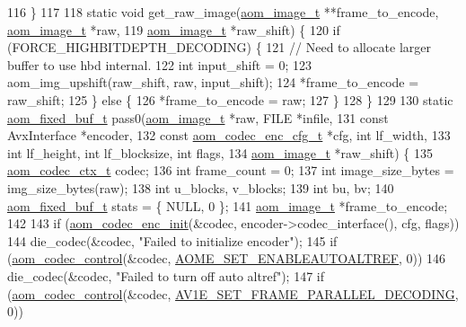 \begin{DoxyCodeInclude}
{116 \}
117 
118 \textcolor{keyword}{static} \textcolor{keywordtype}{void} get\_raw\_image(\hyperlink{structaom__image}{aom\_image\_t} **frame\_to\_encode, \hyperlink{structaom__image}{aom\_image\_t} *raw,
119                           \hyperlink{structaom__image}{aom\_image\_t} *raw\_shift) \{
120   \textcolor{keywordflow}{if} (FORCE\_HIGHBITDEPTH\_DECODING) \{
121     \textcolor{comment}{// Need to allocate larger buffer to use hbd internal.}
122     \textcolor{keywordtype}{int} input\_shift = 0;
123     aom\_img\_upshift(raw\_shift, raw, input\_shift);
124     *frame\_to\_encode = raw\_shift;
125   \} \textcolor{keywordflow}{else} \{
126     *frame\_to\_encode = raw;
127   \}
128 \}
129 
130 \textcolor{keyword}{static} \hyperlink{structaom__fixed__buf}{aom\_fixed\_buf\_t} pass0(\hyperlink{structaom__image}{aom\_image\_t} *raw, FILE *infile,
131                              \textcolor{keyword}{const} AvxInterface *encoder,
132                              \textcolor{keyword}{const} \hyperlink{structaom__codec__enc__cfg}{aom\_codec\_enc\_cfg\_t} *cfg, \textcolor{keywordtype}{int} lf\_width,
133                              \textcolor{keywordtype}{int} lf\_height, \textcolor{keywordtype}{int} lf\_blocksize, \textcolor{keywordtype}{int} flags,
134                              \hyperlink{structaom__image}{aom\_image\_t} *raw\_shift) \{
135   \hyperlink{structaom__codec__ctx}{aom\_codec\_ctx\_t} codec;
136   \textcolor{keywordtype}{int} frame\_count = 0;
137   \textcolor{keywordtype}{int} image\_size\_bytes = img\_size\_bytes(raw);
138   \textcolor{keywordtype}{int} u\_blocks, v\_blocks;
139   \textcolor{keywordtype}{int} bu, bv;
140   \hyperlink{structaom__fixed__buf}{aom\_fixed\_buf\_t} stats = \{ NULL, 0 \};
141   \hyperlink{structaom__image}{aom\_image\_t} *frame\_to\_encode;
142 
143   \textcolor{keywordflow}{if} (\hyperlink{group__encoder_gaade68a7d33d30f97dc9a596aa5e065d8}{aom\_codec\_enc\_init}(&codec, encoder->codec\_interface(), cfg, flags))
144     die\_codec(&codec, \textcolor{stringliteral}{"Failed to initialize encoder"});
145   \textcolor{keywordflow}{if} (\hyperlink{group__codec_ga6da974f4eeaba1fa74106b28d0fe6ac5}{aom\_codec\_control}(&codec, \hyperlink{group__aom__encoder_ggae78dde67a6d78f332e9bdba0dde42db5ac8a24393f214823f5a6bd345afb840b6}{AOME\_SET\_ENABLEAUTOALTREF}, 0))
146     die\_codec(&codec, \textcolor{stringliteral}{"Failed to turn off auto altref"});
147   \textcolor{keywordflow}{if} (\hyperlink{group__codec_ga6da974f4eeaba1fa74106b28d0fe6ac5}{aom\_codec\_control}(&codec, 
      \hyperlink{group__aom__encoder_ggae78dde67a6d78f332e9bdba0dde42db5a465382b6bbca24467739c3c1b94e6483}{AV1E\_SET\_FRAME\_PARALLEL\_DECODING}, 0))
}
\end{DoxyCodeInclude}
